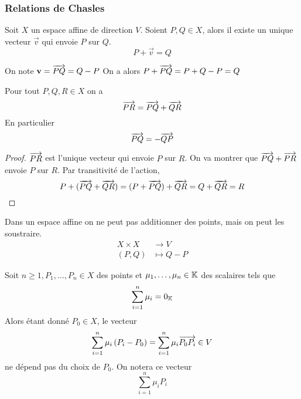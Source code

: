 \subsubsection{Relations de Chasles}

Soit $X$ un espace affine de direction $V$. Soient $P, Q \in X$, alors il existe
un unique vecteur $\vec{v}$ qui envoie $P$ sur $Q$.
\begin{equation*}
	P + \vec{v} = Q
\end{equation*}

\begin{notation}
	On note $\mathbf{v} = \overrightarrow{PQ} = Q - P$
	On a alors $P + \overrightarrow{PQ} = P + Q - P = Q$
\end{notation}

\begin{proposition}
	Pour tout $P, Q, R \in X$ on a
	\begin{equation*}
		\overrightarrow{PR} = \overrightarrow{PQ} + \overrightarrow{QR}
	\end{equation*}
	En particulier
	\begin{equation*}
		\overrightarrow{PQ} = -\overrightarrow{QP}
	\end{equation*}
\end{proposition}

\begin{proof}
	$\overrightarrow{PR}$ est l'unique vecteur qui envoie $P$ sur $R$. On va montrer que
	$\overrightarrow{PQ} + \overrightarrow{PR}$ envoie $P$ sur $R$. Par transitivité de l'action,
	\begin{equation*}
		P + (\overrightarrow{PQ} + \overrightarrow{QR}) = (P + \overrightarrow{PQ}) + \overrightarrow{QR} = Q + \overrightarrow{QR}
		= R
	\end{equation*}
\end{proof}

\begin{remark}
	Dans un espace affine on ne peut pas additionner des points, mais on peut les
	soustraire.
	\begin{align*}
		X\times X &\to V\\
		(P, Q) &\mapsto Q-P
	\end{align*}
\end{remark}

\begin{proposition}
	Soit $n \geq 1, P_1, \dots, P_n \in X$ des points et
	$\mu_1, \dots, \mu_n \in \mathbb{K}$ des scalaires tels que
	\begin{equation*}
		\sum_{i=1}^{n}\mu_{i} = 0_{\mathbb{K}}
	\end{equation*}
	Alors étant donné $P_0 \in X$, le vecteur
	\begin{equation*}
		\sum_{i = 1}^{n}\mu_i\left(P_i - P_0\right) =
		\sum_{i=1}^n \mu_i \overrightarrow{P_0 P_i} \in V
	\end{equation*}
	ne dépend pas du choix de $P_0$. On notera ce vecteur
	\begin{equation*}
		\sum_{i=1}^n \mu_i P_i
	\end{equation*}
\end{proposition}

